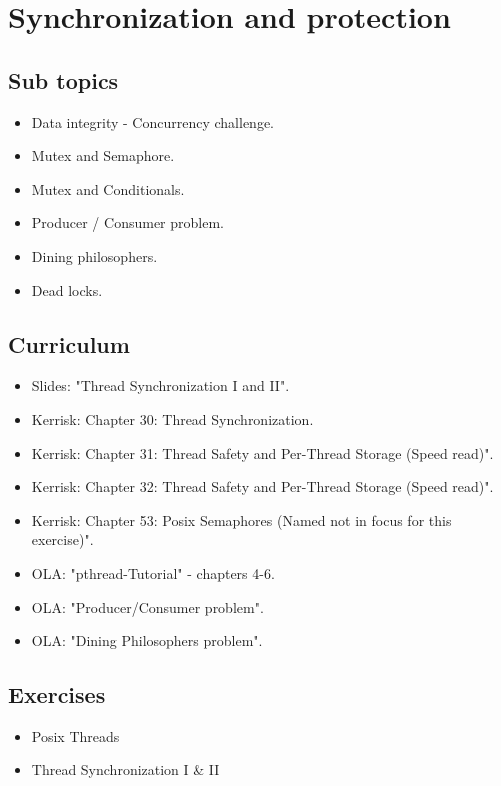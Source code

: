 \section{Synchronization and protection}

\subsection{Sub topics}

\begin{itemize}
	\item Data integrity - Concurrency challenge.
	\item Mutex and Semaphore.
	\item Mutex and Conditionals.
	\item Producer / Consumer problem.
	\item Dining philosophers.
	\item Dead locks.
\end{itemize}

\subsection{Curriculum}

\begin{itemize}
	\item Slides: "Thread Synchronization I and II".
	\item Kerrisk: Chapter 30: Thread Synchronization.
	\item Kerrisk: Chapter 31: Thread Safety and Per-Thread Storage (Speed read)".
	\item Kerrisk: Chapter 32: Thread Safety and Per-Thread Storage (Speed read)".
	\item Kerrisk: Chapter 53: Posix Semaphores (Named not in focus for this exercise)".
	\item OLA: "pthread-Tutorial" - chapters 4-6.
	\item OLA: "Producer/Consumer problem".
	\item OLA: "Dining Philosophers problem".
\end{itemize}

\subsection{Exercises}

\begin{itemize}
	\item Posix Threads
	\item Thread Synchronization I \& II
\end{itemize}

